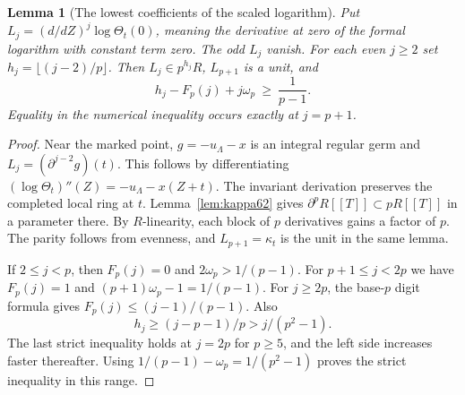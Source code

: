 \documentclass[a4paper,11pt]{article}
\newtheorem{lemma}[proposition]{Lemma}
\theoremstyle{definition}
\theoremstyle{remark}
\numberwithin{equation}{section}
\begin{document}
\begin{lemma}[The lowest coefficients of the scaled logarithm]\label{lem:scale64}
Put \(L_j=(d/dZ)^j\log\Theta_t(0)\), meaning the derivative at zero
of the formal logarithm with constant term zero. The odd \(L_j\)
vanish. For each even \(j\ge2\) set \(h_j=\lfloor(j-2)/p\rfloor\).
Then \(L_j\in p^{h_j}R\), \(L_{p+1}\) is a unit, and
\begin{equation}
      h_j-F_p(j)+j\omega_p\ \ge\ \frac{1}{p-1}.
                                                \label{eq:lowest64}
\end{equation}
Equality in the numerical inequality occurs exactly at \(j=p+1\).
\end{lemma}
\begin{proof}
Near the marked point, \(g=-u_\Lambda-x\) is an integral regular
germ and \(L_j=(\partial^{j-2}g)(t)\). This follows by differentiating
\((\log\Theta_t)''(Z)=-u_\Lambda-x(Z+t)\).
The invariant derivation preserves the completed local ring at \(t\).
Lemma~\ref{lem:kappa62} gives \(\partial^p R[[T]]\subset pR[[T]]\)
in a parameter there. By \(R\)-linearity, each block of \(p\)
derivatives gains a factor of \(p\). The parity follows from
evenness, and \(L_{p+1}=\kappa_t\) is the unit in the same lemma.

If \(2\le j<p\), then \(F_p(j)=0\) and
\(2\omega_p>1/(p-1)\). For \(p+1\le j<2p\) we have
\(F_p(j)=1\) and \((p+1)\omega_p-1=1/(p-1)\).
For \(j\ge2p\), the base-\(p\) digit formula gives
\(F_p(j)\le(j-1)/(p-1)\). Also
\[
       h_j\ge (j-p-1)/p>j/(p^2-1).
\]
The last strict inequality holds at \(j=2p\) for \(p\ge5\),
and the left side increases faster thereafter. Using
\(1/(p-1)-\omega_p=1/(p^2-1)\) proves the strict inequality
in this range.
\end{proof}
\end{document}

